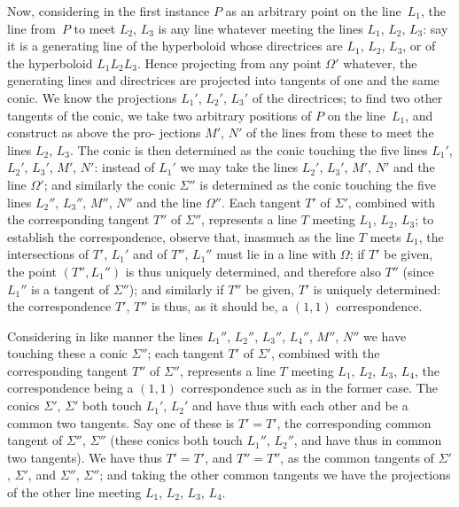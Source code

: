 \documentclass[11pt,a4paper]{article}
\theoremstyle{plain}
\theoremstyle{definition}
\begin{document}
Now, considering in the first instance $P$ as an arbitrary point on the line~$L_1$,
the line from~$P$ to meet $L_2$, $L_3$ is any line whatever meeting the lines $L_1$, $L_2$, $L_3$:
say it is a generating line of the hyperboloid whose directrices are $L_1$, $L_2$, $L_3$, or of
the hyperboloid $L_1L_2L_3$.  Hence projecting from any point $\Omega'$ whatever, the generating
lines and directrices are projected into tangents of one and the same conic.  We know
the projections $L_1'$, $L_2'$, $L_3'$ of the directrices; to find two other tangents of the conic,
we take two arbitrary positions of $P$ on the line~$L_1$, and construct as above the pro-
jections $M'$, $N'$ of the lines from these to meet the lines $L_2$, $L_3$.  The conic is then
determined as the conic touching the five lines $L_1'$, $L_2'$, $L_3'$, $M'$, $N'$: instead of
$L_1'$ we may take the lines $L_2'$, $L_3'$, $M'$, $N'$ and the line $\Omega'$; and similarly the conic
$\Sigma''$ is determined as the conic touching the five lines $L_2''$, $L_3''$, $M''$, $N''$ and the line
$\Omega''$.  Each tangent $T'$ of $\Sigma'$, combined with the corresponding tangent $T''$ of $\Sigma''$,
represents a line $T$ meeting $L_1$, $L_2$, $L_3$; to establish the correspondence, observe that,
inasmuch as the line $T$ meets $L_1$, the intersections of $T'$, $L_1'$ and of $T''$, $L_1''$ must lie
in a line with $\Omega$; if $T'$ be given, the point $(T'', L_1'')$ is thus uniquely determined,
and therefore also $T''$ (since $L_1''$ is a tangent of $\Sigma''$); and similarly if $T''$ be given,
$T'$ is uniquely determined: the correspondence $T'$, $T''$ is thus, as it should be, a
$(1, 1)$ correspondence.

Considering in like manner the lines $L_1''$, $L_2''$, $L_3''$, $L_4''$, $M''$, $N''$ we have touching
these a conic $\Sigma''$; each tangent $T'$ of $\Sigma'$, combined with the corresponding tangent
$T''$ of $\Sigma''$, represents a line $T$ meeting $L_1$, $L_2$, $L_3$, $L_4$, the correspondence being
a $(1, 1)$ correspondence such as in the former case.  The conics $\Sigma'$, $\Sigma'$ both touch
$L_1'$, $L_2'$ and have thus with each other and be a common two tangents.  Say one of
these is $T' = T'$, the corresponding common tangent of $\Sigma''$, $\Sigma''$ (these conics both
touch $L_1''$, $L_2''$, and have thus in common two tangents).  We have thus $T' = T'$,
and $T'' = T''$, as the common tangents of $\Sigma'$, $\Sigma'$, and $\Sigma''$, $\Sigma''$; and taking the
other common tangents we have the projections of the other line meeting $L_1$, $L_2$,
$L_3$, $L_4$.
\end{document}
